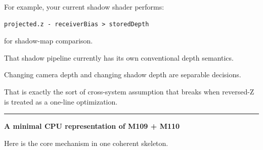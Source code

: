 For example, your current shadow shader performs:

\begin{verbatim}
projected.z - receiverBias > storedDepth
\end{verbatim}

for shadow-map comparison.

That shadow pipeline currently has its own conventional depth semantics.

Changing camera depth and changing shadow depth are separable decisions.

That is exactly the sort of cross-system assumption that breaks when reversed-Z is treated as a one-line optimization.

\begin{center}\rule{0.5\linewidth}{0.5pt}\end{center}

\textbf{A minimal CPU representation of M109 + M110}

Here is the core mechanism in one coherent skeleton.

